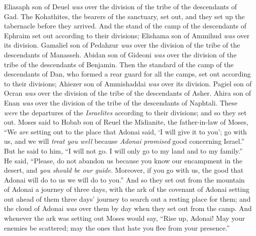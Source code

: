 \begin{biblechapter}
\verse Eliasaph son of Deuel \textit{was} over the division of the tribe of the descendants of Gad.
\verse The Kohathites, the bearers of the sanctuary, set out, and they set up the tabernacle before they arrived.
\verse And the stand of the camp of the descendants of Ephraim set out according to their divisions; Elishama son of Ammihud \textit{was} over its division.
\verse Gamaliel son of Pedahzur \textit{was} over the division of the tribe of the descendants of Manasseh.
\verse Abidan son of Gideoni \textit{was} over the division of the tribe of the descendants of Benjamin.
\verse Then the standard of the camp of the descendants of Dan, who formed a rear guard for all the camps, set out according to their divisions; Ahiezer son of Ammishaddai \textit{was} over its division.
\verse Pagiel son of Ocran \textit{was} over the division of the tribe of the descendants of Asher.
\verse Ahira son of Enan \textit{was} over the division of the tribe of the descendants of Naphtali.
\verse These \textit{were} the departures of the \textit{Israelites} according to their divisions; and so they set out.
\verse Moses said to Hobab son of Reuel the Midianite, the father-in-law of Moses, “We \textit{are} setting out to the place that Adonai said, ‘I will give it to you’; go with us, and we will \textit{treat you well} because \textit{Adonai promised} good concerning Israel.”
\verse But he said to him, “I will not go. I will only go to my land and to my family.”
\verse He said, “Please, do not abandon us because you know our encampment in the desert, and \textit{you should be our guide}.
\verse Moreover, if you go with us, the good that Adonai will do to us we will do to you.”
\verse And so they set out from the mountain of Adonai a journey of three days, with the ark of the covenant of Adonai setting out ahead of them three days’ journey to search out a resting place for them;
\verse and the cloud of Adonai \textit{was} over them by day when they set out from the camp.
\verse And whenever the ark was setting out Moses would say,
\verse “Rise up, Adonai! 
May your enemies be scattered; 
may the ones that hate you flee from your presence.”
\end{biblechapter}

